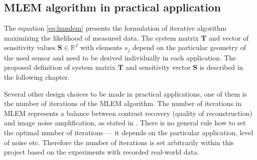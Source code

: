 \subsection{MLEM algorithm in practical application}
The equation \ref{eq:lmmlem} presents the formulation of iterative algorithm maximizing the likelihood of measured data.
The system matrix $\mathbf{T}$ and vector of sensitivity values $\mathbf{S} \in \mathbb{R}^{J}$ with elements $s_{j}$ depend on the particular geometry of the used sensor and need to be derived individually in each application.
The proposed definition of system matrix $\mathbf{T}$ and sensitivity vector $\mathbf{S}$ is described in the following chapter. 

Several other design choices to be made in practical applications, one of them is the number of iterations of the \ac{MLEM} algorithm.
The number of iterations in \ac{MLEM} represents a balance between contrast recovery (quality of reconstruction) and image noise amplification, as stated in \cite{handheld_mlem_reconstruction}.
There is no general rule how to set the optimal number of iterations --- it depends on the particular application, level of noise etc.
Therefore the number of iterations is set arbitrarily within this project based on the experiments with recorded real-world data.








